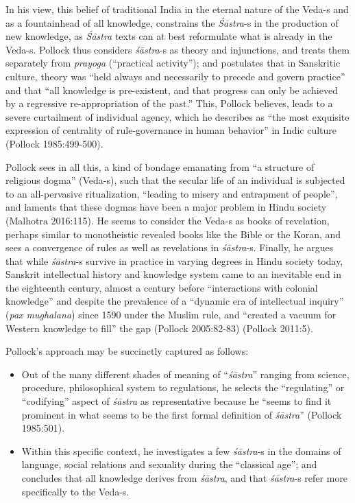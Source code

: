 In his view, this belief of traditional India in the eternal nature of the Veda-s and as a fountainhead of all knowledge, constrains the {\sl Śāstra}-s in the production of new knowledge, as {\sl Śāstra} texts can at best reformulate what is already in the Veda-s. Pollock thus considers {\sl śāstra}-s as theory and injunctions, and treats them separately from {\sl prayoga} (``practical activity''); and postulates that in Sanskritic culture, theory was ``held always and necessarily to precede and govern practice'' and that ``all knowledge is pre-existent, and that progress can only be achieved by a regressive re-appropriation of the past.'' This, Pollock believes, leads to a severe curtailment of individual agency, which he describes as ``the most exquisite expression of centrality of rule-governance in human behavior'' in Indic culture (Pollock 1985:499-500). 

Pollock sees in all this, a kind of bondage emanating from ``a structure of religious dogma'' (Veda-s), such that the secular life of an individual is subjected to an all-pervasive ritualization, ``leading to misery and entrapment of people'', and laments that these dogmas have been a major problem in Hindu society (Malhotra 2016:115). He seems to consider the Veda-s as books of revelation, perhaps similar to monotheistic revealed books like the Bible or the Koran, and sees a convergence of rules as well as revelations in {\sl śāstra}-s. Finally, he argues that while {\sl śāstra}-s survive in practice in varying degrees in Hindu society today, Sanskrit intellectual history and knowledge system came to an inevitable end in the eighteenth century, almost a century before ``interactions with colonial knowledge'' and despite the prevalence of a ``dynamic era of intellectual inquiry'' ({\sl pax mughalana}) since 1590 under the Muslim rule, and ``created a vacuum for Western knowledge to fill'' the gap (Pollock 2005:82-83) (Pollock 2011:5).

Pollock's approach may be succinctly captured as follows:
\begin{itemize}
\item Out of the many different shades of meaning of ``{\sl śāstra}'' ranging from science, procedure, philosophical system to regulations, he selects the ``regulating'' or ``codifying'' aspect of {\sl śāstra} as representative because he ``seems to find it prominent in what seems to be the first formal definition of {\sl śāstra}'' (Pollock 1985:501).

\item Within this specific context, he investigates a few {\sl śāstra}-s in the domains of language, social relations and sexuality during the ``classical age''; and concludes that all knowledge derives from {\sl śāstra}, and that {\sl śāstra}-s refer more specifically to the Veda-s. 
\end{itemize}

